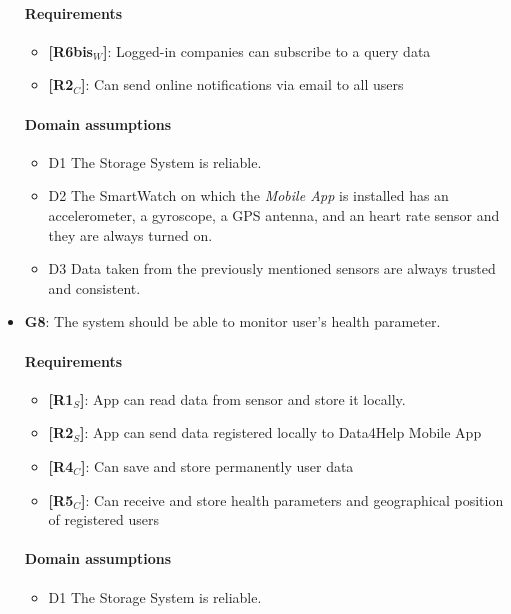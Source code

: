 \begin{itemize}
    \paragraph{Requirements}
   \begin{itemize}
       \item \textbf{[R6bis$_W$]}: Logged-in companies can subscribe to a query data
       \item \textbf{[R2$_C$]}: Can send online notifications via email to all users
   \end{itemize}
   \paragraph{Domain assumptions}
   \begin{itemize}
        \item  D1  The Storage System is reliable.
    
        \item  D2  The SmartWatch on which the \textit{Mobile App} is installed has an accelerometer, a gyroscope, a GPS antenna, and an heart rate sensor and they are always turned on.
    
        \item  D3  Data taken from the previously mentioned sensors are always trusted and consistent.
   \end{itemize}
   
    \item \textbf{G8}: The system should be able to monitor user's health parameter.
    \paragraph{Requirements}
   \begin{itemize}
       \item \textbf{[R1$_S$]}: App can read data from sensor and store it locally.
        \item \textbf{[R2$_S$]}: App can send data registered locally to Data4Help Mobile App
        \item \textbf{[R4$_C$]}: Can save and store permanently user data
    \item \textbf{[R5$_C$]}: Can receive and store health parameters and geographical position of registered users

   \end{itemize}
   \paragraph{Domain assumptions}
   \begin{itemize}
    \item  D1  The Storage System is reliable.
    

\end{itemize}
\end{itemize}

